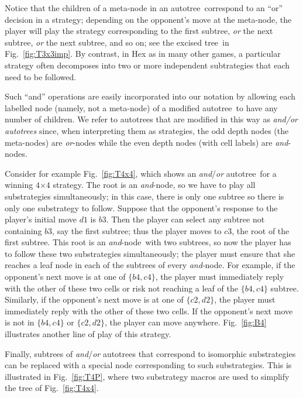 \documentclass{llncs}
\def\at{autotree}
\def\aoat{{\it and}/{\it or} autotree}
\def\exct{excised tree}
\def\myAND{\mbox{\it and}}
\def\myOR{\mbox{\it or}}
\def\andnode{\myAND-node}
\def\ornode{\myOR-node}
\newcommand{\board}[2]{\mbox{$#1$$\times$$#2$}}
\begin{document}




Notice that the children of a meta-node in an \at\
correspond to an ``or'' decision in a strategy;
depending on the opponent's move at the meta-node,
the player will play the strategy
corresponding to the first subtree,
{\it or} the next subtree, {\it or} the next subtree, and so on;
see the \exct\ in Fig.~\ref{fig:T3x3imp}.
By contrast, in Hex as in many other games,
a particular strategy often decomposes into two
or more independent subtrategies that each need to be followed.

Such ``and'' operations are easily incorporated into our notation 
by allowing each labelled node (namely, not a meta-node) of a 
modified \at\ to have any number of children.
We refer to \at s that are modified in this way as 
{\it \aoat s} since, when interpreting them as strategies,
the odd depth nodes (the meta-nodes) are \ornode s while
the even depth nodes (with cell labels) are \andnode s.

Consider for example Fig.~\ref{fig:T4x4},
which shows an \aoat\ for a winning \board{4}{4} strategy.
The root is an \andnode, so we have to play
all substrategies simultaneously;
in this case, there is only one subtree
so there is only one substrategy to follow.
Suppose that the opponent's response to
the player's initial move $d1$ is $b3$.
Then the player can select any subtree not containing $b3$,
say the first subtree;
thus the player moves to $c3$,
the root of the first subtree.
This root is an \andnode\ with two subtrees,
so now the player has to follow these two substrategies
simultaneously;
the player must ensure that she reaches a leaf node
in each of the subtrees of every \andnode.
For example,
if the opponent's next move is at one of $\{b4,c4\}$, 
the player must immediately reply
with the other of these two cells 
or risk not reaching a leaf of the $\{b4,c4\}$ subtree.
Similarly, if the opponent's next move is at one of $\{c2,d2\}$, 
the player must immediately reply
with the other of these two cells.
If the opponent's next move is not in $\{b4,c4\}$ or
$\{c2,d2\}$, the player can move anywhere.
Fig.~\ref{fig:B4} illustrates another line of play of this strategy.



Finally, subtrees of \aoat s
that correspond to isomorphic substrategies
can be replaced with a special node
corresponding to such substrategies.
This is illustrated in Fig.~\ref{fig:T4P},
where two substrategy macros are used
to simplify the tree of 
Fig.~\ref{fig:T4x4}.
\end{document}

